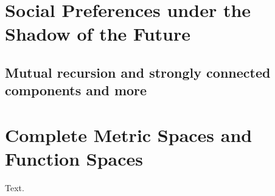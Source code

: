 \documentclass[12pt]{akizumi-book}
\begin{document}
\chapter{Social Preferences under the Shadow of the Future}
\section{Mutual recursion and strongly connected components and more}
\chapter{Complete Metric Spaces and Function Spaces}
Text.
\end{document}
